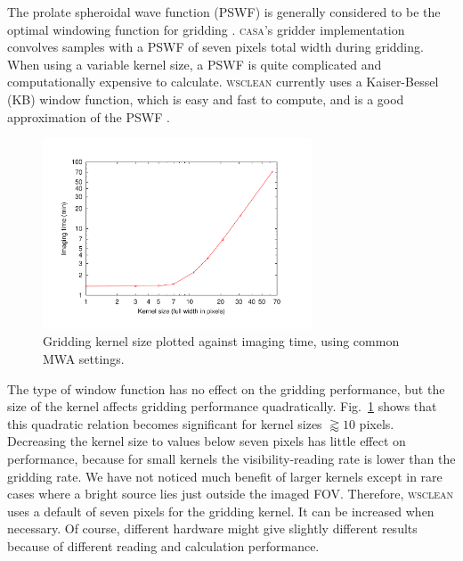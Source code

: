\documentclass[useAMS,usenatbib]{mn2e}
\begin{document}
The prolate spheroidal wave function (PSWF) is generally considered to be the optimal windowing function for gridding \citep{fourier-kernel-selection-1991}. \textsc{casa}'s gridder implementation convolves samples with a PSWF of seven pixels total width during gridding. When using a variable kernel size, a PSWF is quite complicated and computationally expensive to calculate. \textsc{wsclean} currently uses a Kaiser-Bessel (KB) window function, which is easy and fast to compute, and is a good approximation of the PSWF \citep{fourier-kernel-selection-1991}.

\begin{figure}
\begin{center}
\includegraphics[width=8cm]{img/benchmark-kernelsize/kernel}
\caption{Gridding kernel size plotted against imaging time, using common MWA settings.}
\label{fig:timing-kernelsize}
\end{center}
\end{figure}

The type of window function has no effect on the gridding performance, but the size of the kernel affects gridding performance quadratically. Fig.~\ref{fig:timing-kernelsize} shows that this quadratic relation becomes significant for kernel sizes $\gtrapprox 10$ pixels. Decreasing the kernel size to values below seven pixels has little effect on performance, because for small kernels the visibility-reading rate is lower than the gridding rate. We have not noticed much benefit of larger kernels except in rare cases where a bright source lies just outside the imaged FOV. Therefore, \textsc{wsclean} uses a default of seven pixels for the gridding kernel. It can be increased when necessary. Of course, different hardware might give slightly different results because of different reading and calculation performance.
\end{document}
